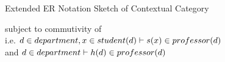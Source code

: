 


\begin{frame}{Extended ER Notation Sketch of Contextual Category}
\sketchgraph{\ncsar}
\pause 
\begin{block}{subject to commutivity of }
\vspace{0.15cm}
\studentProfessorDepartmentCommutingDiagrams{\ncsar} \\
\vspace{0.1cm}
i.e. $d \in department, x \in student(d) \vdash s(x) \in professor(d)$ \\
and $d \in department  \vdash h(d) \in professor(d)$
\end{block}

\end{frame}



